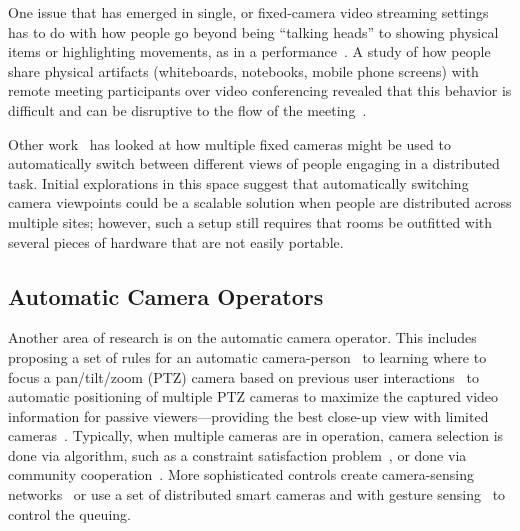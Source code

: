 \documentclass{tufte-handout}
\begin{document}
One issue that has emerged in single, or fixed-camera video streaming
settings has to do with how people go beyond being ``talking heads''
to showing physical items or highlighting movements, as in a
performance~\cite{reeves2015d}. A study of how people share physical
artifacts (whiteboards, notebooks, mobile phone screens) with remote
meeting participants over video conferencing revealed that this
behavior is difficult and can be disruptive to the flow of the
meeting~\cite{Marlow:2016:BTH:2818048.2819958}.

Other work~\cite{ursu2015experimental} has looked at how multiple
fixed cameras might be used to automatically switch between different
views of people engaging in a distributed task. Initial explorations
in this space suggest that automatically switching camera viewpoints
could be a scalable solution when people are distributed across
multiple sites; however, such a setup still requires that rooms be
outfitted with several pieces of hardware that are not easily
portable.

\subsection{Automatic Camera Operators}
Another area of research is on the automatic camera operator. This
includes proposing a set of rules for an automatic
camera-person~\cite{Strubbe:2001:UVC:634067.634264} to learning where
to focus a pan/tilt/zoom (PTZ) camera based on previous user
interactions~\cite{liu2003learning} to automatic positioning of
multiple PTZ cameras to maximize the captured video information for
passive viewers---providing the best close-up view with limited
cameras~\cite{liu2005online}.  Typically, when multiple cameras are in
operation, camera selection is done via algorithm, such as a
constraint satisfaction
problem~\cite{Janzen:2008:CSU:1496984.1497038}, or done via community
cooperation~\cite{Sa:2014:LMC:2584567.2584573}.  More sophisticated
controls create camera-sensing
networks~\cite{Qureshi:2010:CSV:1865987.1866017} or use a set of
distributed smart cameras and with gesture
sensing~\cite{Lin:2010:SSA:1721695.1721704} to control the queuing.
\end{document}

